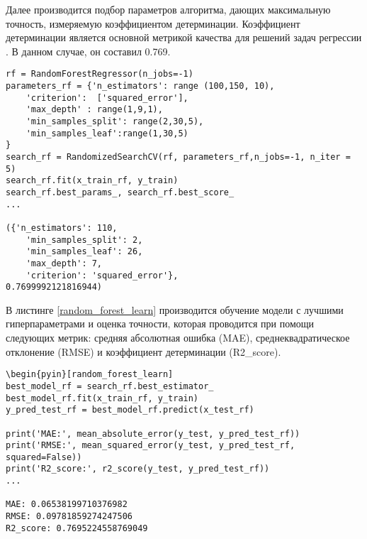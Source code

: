 Далее производится подбор параметров алгоритма, дающих максимальную точность, измеряемую коэффициентом детерминации. Коэффициент детерминации является основной метрикой качества для решений задач регрессии \cite{gomar2011validation}. В данном случае, он составил 0.769.

\begin{lstlisting}
rf = RandomForestRegressor(n_jobs=-1)
parameters_rf = {'n_estimators': range (100,150, 10),
    'criterion':  ['squared_error'],
    'max_depth' : range(1,9,1),
    'min_samples_split': range(2,30,5),
    'min_samples_leaf':range(1,30,5)
}
search_rf = RandomizedSearchCV(rf, parameters_rf,n_jobs=-1, n_iter = 5)
search_rf.fit(x_train_rf, y_train)
search_rf.best_params_, search_rf.best_score_
...

({'n_estimators': 110,
    'min_samples_split': 2,
    'min_samples_leaf': 26,
    'max_depth': 7,
    'criterion': 'squared_error'},
0.7699992121816944)
\end{lstlisting}

В листинге \ref{random_forest_learn} производится обучение модели с лучшими гиперпараметрами и оценка точности, которая проводится при помощи следующих метрик:  средняя абсолютная ошибка (MAE), среднеквадратическое отклонение (RMSE) и коэффициент детерминации (R2\_score).
\begin{lstlisting}
\begin{pyin}[random_forest_learn]
best_model_rf = search_rf.best_estimator_
best_model_rf.fit(x_train_rf, y_train)
y_pred_test_rf = best_model_rf.predict(x_test_rf)

print('MAE:', mean_absolute_error(y_test, y_pred_test_rf))
print('RMSE:', mean_squared_error(y_test, y_pred_test_rf, squared=False))
print('R2_score:', r2_score(y_test, y_pred_test_rf))
...

MAE: 0.06538199710376982
RMSE: 0.09781859274247506
R2_score: 0.7695224558769049
\end{lstlisting}

